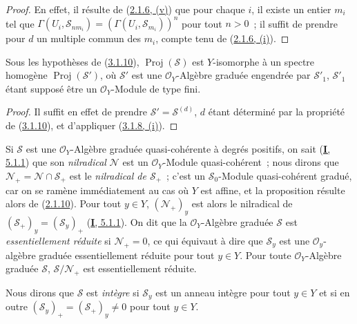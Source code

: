 \begin{proof}
En effet, il résulte de (\hyperref[II.2.1.6-fr]{2.1.6, (v)}) que pour chaque
$i$, il existe un entier $m_i$ tel que
$\Gamma(U_i,\mathcal{S}_{nm_i})=(\Gamma(U_i,\mathcal{S}_{m_i}))^n$ pour tout
$n>0$~; il suffit de prendre pour $d$ un multiple commun des $m_i$, compte
tenu de (\hyperref[II.2.1.6-fr]{2.1.6, (i)}).
\end{proof}

\begin{corollary}[3.1.11]
\label{II.3.1.11-fr}
Sous les hypothèses de \textup{(\hyperref[II.3.1.10-fr]{3.1.10})},
$\operatorname{Proj}(\mathcal{S})$ est $Y$-isomorphe à un spectre homogène
$\operatorname{Proj}(\mathcal{S}')$, où $\mathcal{S}'$ est une
$\mathcal{O}_Y$-Algèbre graduée engendrée par $\mathcal{S}'_1$,
$\mathcal{S}'_1$ étant supposé être un $\mathcal{O}_Y$-Module de type fini.
\end{corollary}

\begin{proof}
Il suffit en effet de prendre $\mathcal{S}'=\mathcal{S}^{(d)}$, $d$ étant
déterminé par la propriété de (\hyperref[II.3.1.10-fr]{3.1.10}), et
d'appliquer (\hyperref[II.3.1.8-fr]{3.1.8, (i)}).
\end{proof}

\begin{env}[3.1.12]
\label{II.3.1.12-fr}
Si $\mathcal{S}$ est une $\mathcal{O}_Y$-Algèbre graduée quasi-cohérente à
degrés positifs, on sait (\hyperref[I.5.1.1-fr]{\textbf{I}, 5.1.1}) que son
\emph{nilradical} $\mathcal{N}$ est un $\mathcal{O}_Y$-Module
quasi-cohérent~; nous dirons que $\mathcal{N}_+=\mathcal{N}\cap\mathcal{S}_+$
est le \emph{nilradical de $\mathcal{S}_+$}~; c'est un
$\mathcal{S}_0$-Module quasi-cohérent gradué, car on se ramène immédiatement
au cas où $Y$ est affine, et la proposition résulte alors de
(\hyperref[II.2.1.10-fr]{2.1.10}). Pour tout $y\in Y$,
$(\mathcal{N}_+)_y$ est alors le nilradical de
$(\mathcal{S}_+)_y=(\mathcal{S}_y)_+$
(\hyperref[I.5.1.1-fr]{\textbf{I}, 5.1.1}). On dit que la
$\mathcal{O}_Y$-Algèbre graduée $\mathcal{S}$ est \emph{essentiellement
réduite} si $\mathcal{N}_+=0$, ce qui équivaut
à dire que $\mathcal{S}_y$
est une $\mathcal{O}_y$-algèbre graduée essentiellement réduite pour tout
$y\in Y$. Pour toute $\mathcal{O}_Y$-Algèbre graduée $\mathcal{S}$,
$\mathcal{S}/\mathcal{N}_+$ est essentiellement réduite.

Nous dirons que $\mathcal{S}$ est \emph{intègre} si $\mathcal{S}_y$ est un
anneau intègre pour tout $y\in Y$ et si en outre
$(\mathcal{S}_y)_+=(\mathcal{S}_+)_y\neq0$ pour tout $y\in Y$.
\end{env}

